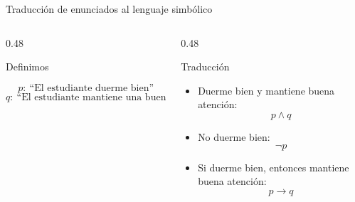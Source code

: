 \documentclass[aspectratio=169,10pt,handout]{beamer}
\newenvironment{IdeaClave}[1]
{
	\begin{block}{#1}
		\justifying
	}
	{
	\end{block}
}
\newenvironment{Ejemplo}[1]
{
	\begin{exampleblock}{#1}
		\justifying
	}
	{
	\end{exampleblock}
}
\begin{document}
	\begin{frame}{Traducción de enunciados al lenguaje simbólico}
		\begin{columns}[T,totalwidth=\textwidth]
			\begin{column}{0.48\textwidth}
				\begin{IdeaClave}{Definimos}
					\[
					p:\ \text{``El estudiante duerme bien''}
					\]
					\[
					q:\ \text{``El estudiante mantiene una buena atención''}
					\]
				\end{IdeaClave}
			\end{column}
			\begin{column}{0.48\textwidth}
				\begin{Ejemplo}{Traducción}
					\begin{itemize}[leftmargin=*]
						\item Duerme bien y mantiene buena atención:
						\[
						p \land q
						\]
						\item No duerme bien:
						\[
						\neg p
						\]
						\item Si duerme bien, entonces mantiene buena atención:
						\[
						p \to q
						\]
					\end{itemize}
				\end{Ejemplo}
			\end{column}
		\end{columns}
	\end{frame}
	
\end{document}
